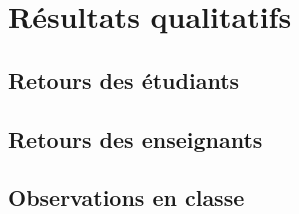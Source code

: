 
\chapter{Résultats qualitatifs}\label{chap:qualitatif}

\section{Retours des étudiants}

\section{Retours des enseignants}

\section{Observations en classe}
